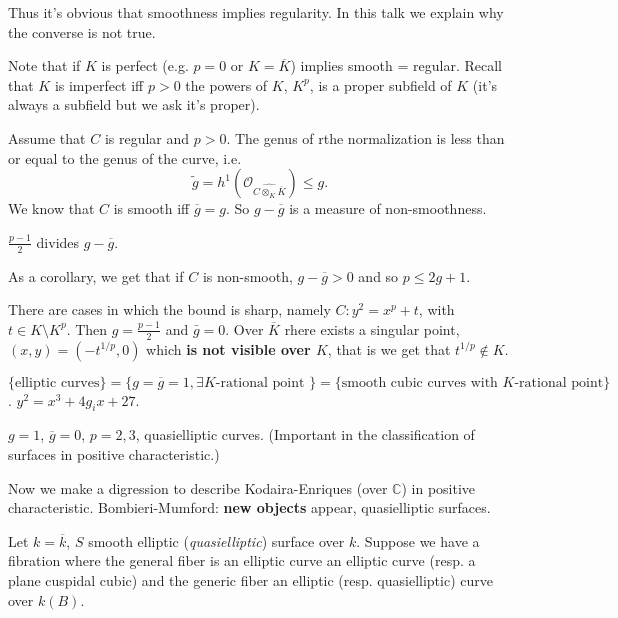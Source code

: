 \noindent
Thus it's obvious that smoothness implies regularity.
In this talk we explain why the converse is not true.

Note that if $K$ is perfect (e.g. $p=0$ or $K=\overline{K}$) implies
 smooth = regular. Recall that $K$ is imperfect iff $p>0$
the powers of $K$, $K^p$, is a proper subfield of $K$
(it's always a subfield but we ask it's proper).

\medskip\noindent
Assume that $C$ is regular and $p>0$.
The genus of rthe normalization is less than or equal to the genus of the curve,
i.e.
$$
\tilde{g}=h^1(\mathcal{O}_{\widehat{C \otimes_K \overline{K}}})\leq g.
$$
We know that $C$ is smooth iff $\overline{g}=g$.
So $g-\overline{g}$ is a measure of non-smoothness.

\begin{theorem}[Tate]
\label{theorem-tate}
$\frac{p-1}{2}$ divides $g-\overline{g}$.
\end{theorem}

As a corollary, we get that if $C$ is non-smooth,
$g-\overline{g}>0$ and so $p \leq  2g+1$.

\begin{example}
\label{example-attain}
There are cases in which the bound is sharp,
namely $C:y^2=x^p+t$, with $t \in K\setminus K^p$.
Then $g=\frac{p-1}{2}$ and $\bar{g}=0$.
Over $\overline{K}$ rhere exists a singular point,
$(x,y)=(-t^{1/p},0)$ which
{\bf is not visible over $K$}, that is we get that
$t^{1/p}\not \in K$.
\end{example}

\begin{example}
\label{example-elliptic}
$\{\text{elliptic curves}\}=\{g = \overline{g}=1,\text{$\exists K$-rational
point }\}=\{\text{smooth cubic curves with $K$-rational point}\}$.
$y^2=x^3+4g_i x+27$.
\end{example}

\begin{example}
\label{example-quasielliptic}
$g=1$, $\overline{g}=0$, $p=2,3$,
quasielliptic curves. (Important in the classification of surfaces
in positive characteristic.)
\end{example}

\medskip\noindent
Now we make a digression to describe Kodaira-Enriques (over $\mathbb{C}$)
in positive characteristic. Bombieri-Mumford: {\bf new objects} appear,
quasielliptic surfaces.

Let $k=\overline{k}$, $S$ smooth elliptic 
({\it quasielliptic}) surface over $k$. Suppose we have a fibration
where the general fiber is an elliptic curve an elliptic curve (resp. a plane 
cuspidal cubic) and the generic fiber an elliptic (resp. quasielliptic)
curve over $k(B)$.

